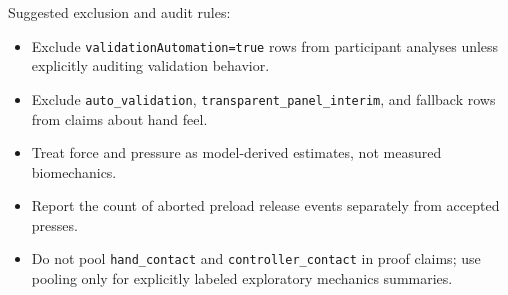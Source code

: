 \documentclass[11pt]{article}
\begin{document}
Suggested exclusion and audit rules:
\begin{itemize}
  \item Exclude \texttt{validationAutomation=true} rows from participant analyses unless explicitly auditing validation behavior.
  \item Exclude \texttt{auto\_validation}, \texttt{transparent\_panel\_interim}, and fallback rows from claims about hand feel.
  \item Treat force and pressure as model-derived estimates, not measured biomechanics.
  \item Report the count of aborted preload release events separately from accepted presses.
  \item Do not pool \texttt{hand\_contact} and \texttt{controller\_contact} in proof claims; use pooling only for explicitly labeled exploratory mechanics summaries.
\end{itemize}
\end{document}
